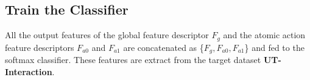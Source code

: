  
\subsection{Train the Classifier}
All the output features of the global feature descriptor \(F_g\) and the atomic action feature descriptors \(F_{a0}\) and \(F_{a1}\) are concatenated as \{\(F_g, F_{a0}, F_{a1}\)\} and fed to the softmax classifier. These features are extract from the target dataset \textbf{UT-Interaction}.  
